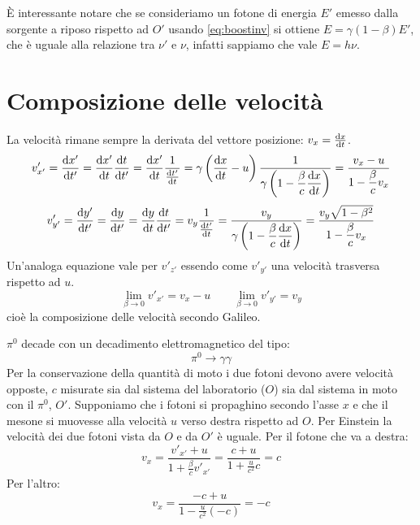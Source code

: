 È interessante notare che se consideriamo un fotone di energia $E'$ emesso dalla sorgente a riposo rispetto ad $O'$ usando \eqref{eq:boostinv} si ottiene $E = \gamma(1-\beta)E'$, che è uguale alla relazione tra $\nu'$ e $\nu$, infatti sappiamo che vale $E=h\nu$.


\section{Composizione delle velocità}
La velocità rimane sempre la derivata del vettore posizione: $v_x=\frac{\mathrm{d} x}{\mathrm{d} t}$.
\begin{equation}
   v'_{x'}=\frac{\mathrm{d} x'}{\mathrm{d} t'}=\frac{\mathrm{d} x'}{\mathrm{d} t}\frac{\mathrm{d} t}{\mathrm{d} t'}=\frac{\mathrm{d} x'}{\mathrm{d} t}\dfrac{1}{\frac{\mathrm{d} t'}{\mathrm{d} t}}=\gamma\left(\frac{\mathrm{d} x}{\mathrm{d} t}-u\right)\dfrac{1}{\gamma\left(1-\dfrac{\beta}{c}\dfrac{\mathrm{d} x}{\mathrm{d} t}\right)}=\dfrac{v_x-u}{1-\dfrac{\beta}{c}v_x}
\end{equation}
\begin{equation}
   v'_{y'}=\frac{\mathrm{d} y'}{\mathrm{d} t'}=\frac{\mathrm{d} y}{\mathrm{d} t'}=\frac{\mathrm{d} y}{\mathrm{d} t}\frac{\mathrm{d} t}{\mathrm{d} t'}=v_y\frac{1}{\frac{\mathrm{d} t'}{\mathrm{d} t}}=\dfrac{v_y}{\gamma\left(1-\dfrac{\beta}{c}\dfrac{\mathrm{d} x}{\mathrm{d} t}\right)}=\dfrac{v_y\sqrt{1-\beta^2}}{1-\dfrac{\beta}{c}v_x}
\end{equation}
Un'analoga equazione vale per $v'_{z'}$ essendo come $v'_{y'}$ una velocità trasversa rispetto ad $u$.
\[\lim_{\beta\rightarrow 0}v'_{x'}=v_x-u\qquad \lim_{\beta\rightarrow 0} v'_{y'}=v_y\]
cioè la composizione delle velocità secondo Galileo.

\begin{Es}[decadimento $\pi^0$]
   $\pi^0$ decade con un decadimento elettromagnetico del tipo:
   \[\pi^0\rightarrow \gamma\gamma\]
   Per la conservazione della quantità di moto i due fotoni devono avere velocità opposte, $c$ misurate sia dal sistema del laboratorio ($O$) sia dal sistema in moto con il $\pi^0$, $O'$. Supponiamo che i fotoni si propaghino secondo l'asse $x$ e che il mesone si muovesse alla velocità $u$ verso destra rispetto ad $O$. Per Einstein la velocità dei due fotoni vista da $O$ e da $O'$ è uguale.
   Per il fotone che va a destra:
   \[v_x=\frac{v'_{x'}+u}{1+\frac{\beta}{c}v'_{x'}}=\frac{c+u}{1+\frac{u}{c^2}c}=c\]
   Per l'altro:
   \[v_x=\frac{-c+u}{1-\frac{u}{c^2}(-c)}=-c\]
\end{Es}

